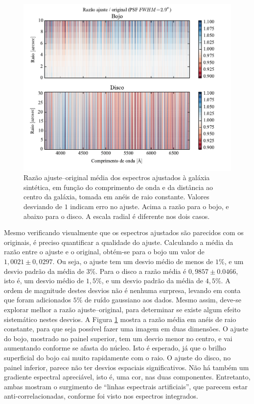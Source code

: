 \begin{figure}
	\includegraphics{figuras/simulation_error}
	\caption[Razão ajuste--original dos espectros ajustados à galáxia sintética.]
	{Razão ajuste--original média dos espectros ajustados à galáxia sintética, em
	função do comprimento de onda e da distância ao centro da galáxia, tomada em
	anéis de raio constante. Valores desviando de $1$ indicam erro no ajuste.
	Acima a razão para o bojo, e abaixo para o disco. A escala radial é
	diferente nos dois casos.}
	\label{fig:testFitError}
\end{figure}

Mesmo verificando visualmente que os espectros ajustados são parecidos com os
originais, é preciso quantificar a qualidade do ajuste. Calculando a média da
razão entre o ajuste e o original, obtém-se para o bojo um valor de $1,0021 \pm
0,0297$. Ou seja, o ajuste tem um desvio médio de menos de $1\%$, e um desvio
padrão da média de $3\%$. Para o disco a razão média é $0,9857 \pm 0.0466$, isto
é, um desvio médio de $1,5\%$, e um desvio padrão da média de $4,5\%$. A ordem
de magnitude destes desvios não é nenhuma surpresa, levando em conta que foram
adicionados $5\%$ de ruído gaussiano aos dados. Mesmo assim, deve-se explorar
melhor a razão ajuste--original, para determinar se existe algum efeito
sistemático nestes desvios. A Figura \ref{fig:testFitError} mostra a razão média
em anéis de raio constante, para que seja possível fazer uma imagem em duas
dimensões. O ajuste do bojo, mostrado no painel superior, tem um desvio menor no
centro, e vai aumentando conforme se afasta do núcleo. Isto é esperado, já que o
brilho superficial do bojo cai muito rapidamente com o raio. O ajuste do disco,
no painel inferior, parece não ter desvios espaciais significativos.
Não há também um gradiente espectral apreciável, isto é, uma cor, nas duas
componentes. Entretanto, ambas mostram o surgimento de ``linhas espectrais
artificiais'', que parecem estar anti-correlacionadas, conforme foi visto nos
espectros integrados.

